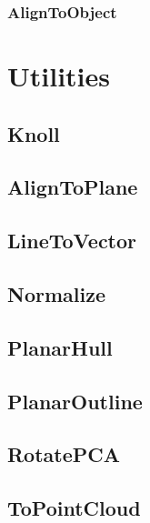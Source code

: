 \documentclass{ol-softwaremanual}
\begin{document}
\subsubsection{AlignToObject}

\section{Utilities}

\subsection{Knoll}

\subsection{AlignToPlane}

\subsection{LineToVector}

\subsection{Normalize}

\subsection{PlanarHull}

\subsection{PlanarOutline}

\subsection{RotatePCA}

\subsection{ToPointCloud}

% 
\end{document}
